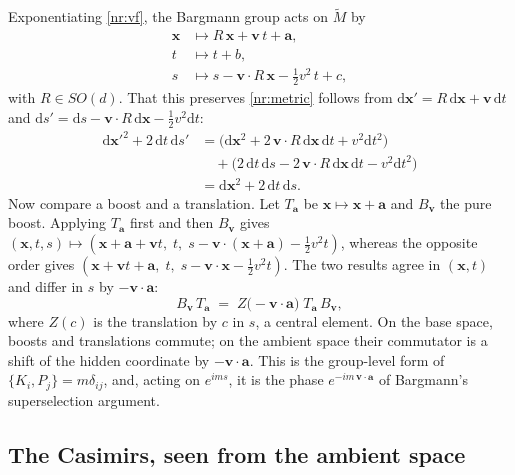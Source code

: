 Exponentiating \eqref{nr:vf}, the Bargmann group acts on $\tilde M$ by
\begin{equation}
  \begin{aligned}
    \mathbf{x}&\mapsto R\,\mathbf{x}+\mathbf{v}\,t+\mathbf{a},\\
    t&\mapsto t+b,\\
    s&\mapsto s-\mathbf{v}\cdot R\,\mathbf{x}-\tfrac12 v^2\,t+c,
  \end{aligned}
  \label{nr:finite}
\end{equation}
with $R\in SO(d)$. That this preserves \eqref{nr:metric} follows from
$\mathrm{d}\mathbf{x}'=R\,\mathrm{d}\mathbf{x}+\mathbf{v}\,\mathrm{d}t$ and
$\mathrm{d}s'=\mathrm{d}s-\mathbf{v}\cdot R\,\mathrm{d}\mathbf{x}-\tfrac12 v^2\mathrm{d}t$:
\begin{align*}
  \mathrm{d}\mathbf{x}'^2+2\,\mathrm{d}t\,\mathrm{d}s'
  &=\bigl(\mathrm{d}\mathbf{x}^2+2\,\mathbf{v}\cdot R\,\mathrm{d}\mathbf{x}\,\mathrm{d}t+v^2\mathrm{d}t^2\bigr)\\
  &\quad+\bigl(2\,\mathrm{d}t\,\mathrm{d}s-2\,\mathbf{v}\cdot R\,\mathrm{d}\mathbf{x}\,\mathrm{d}t-v^2\mathrm{d}t^2\bigr)\\
  &=\mathrm{d}\mathbf{x}^2+2\,\mathrm{d}t\,\mathrm{d}s .
\end{align*}
Now compare a boost and a translation. Let $T_{\mathbf a}$ be $\mathbf{x}\mapsto
\mathbf{x}+\mathbf{a}$ and $B_{\mathbf v}$ the pure boost. Applying $T_{\mathbf a}$
first and then $B_{\mathbf v}$ gives
$(\mathbf{x},t,s)\mapsto(\mathbf{x}+\mathbf{a}+\mathbf{v}t,\;t,\;s-\mathbf{v}\cdot(\mathbf{x}+\mathbf{a})-\tfrac12 v^2t)$,
whereas the opposite order gives
$(\mathbf{x}+\mathbf{v}t+\mathbf{a},\;t,\;s-\mathbf{v}\cdot\mathbf{x}-\tfrac12 v^2t)$.
The two results agree in $(\mathbf{x},t)$ and differ in $s$ by $-\mathbf{v}\cdot\mathbf{a}$:
\begin{equation}
  B_{\mathbf v}\,T_{\mathbf a}\;=\;Z\bigl(-\mathbf{v}\cdot\mathbf{a}\bigr)\;T_{\mathbf a}\,B_{\mathbf v},
  \label{nr:groupcomm}
\end{equation}
where $Z(c)$ is the translation by $c$ in $s$, a central element. On the base
space, boosts and translations commute; on the ambient space their commutator is
a shift of the hidden coordinate by $-\mathbf{v}\cdot\mathbf{a}$. This is the
group-level form of $\{K_i,P_j\}=m\delta_{ij}$, and, acting on $e^{ims}$, it is
the phase $e^{-im\,\mathbf{v}\cdot\mathbf{a}}$ of Bargmann's superselection
argument.

\subsection{The Casimirs, seen from the ambient space}

